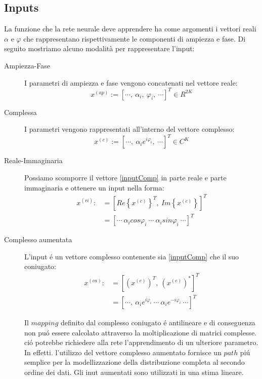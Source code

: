 \documentclass[a4paper,10pt]{article}
\begin{document}
\subsection{Inputs}
La funzione che la rete neurale deve apprendere ha come argomenti i vettori reali $\alpha$ e $\varphi$ che rappresentano rispettivamente le componenti di ampiezza e fase. Di seguito mostriamo alcuno modalità per rappresentare l'input:
\begin{description}
 \item[Ampiezza-Fase]
 I parametri di ampiezza e fase vengono concatenati nel vettore reale:
 \begin{equation}
  x^{\left( ap\right) } :=\left[ \cdots, \ \alpha_i, \ \varphi_i, \ \cdots\right]^T\in R^{2K}
 \end{equation}

 \item[Complessa] 
 I parametri vengono rappresentati all'interno del vettore complesso:
 \begin{equation}
  x^{\left( c\right) } :=\left[ \cdots, \ \alpha_i e^{i \varphi_i}, \ \cdots\right]^T\in C^{K}\label{inputComp}
 \end{equation}
 
 \item[Reale-Immaginaria]
 Possiamo scomporre il vettore \eqref{inputComp} in parte reale e parte immaginaria e ottenere un input nella forma:
 \begin{align}
  x^{\left( ri\right) } :&=\left[ Re\left \{ x^{\left(c\right) }\right \}^T, \ Im\left \{ x^{\left(c\right) } \right \} \right]^T\\
  &=\left[ \cdots \ \alpha_i cos\varphi_i \ \cdots \ \alpha_i sin\varphi_i \ \cdots\right]^T
 \end{align}

 \item[Complesso aumentata]
 L'input \'e un vettore complesso contenente sia \eqref{inputComp} che il suo coniugato:
 \begin{align}
  x^{\left( ca\right) } :&=\left[ \left( x^{\left(c\right) }\right)^T, \ \left( x^{\left(c\right) } \right)^* \right]^T\\
  &=\left[ \cdots, \ \alpha_i e^{i \varphi_i} \ \cdots \ \alpha_i e^{-i \varphi_i} \ \cdots\right]^T
 \end{align}

 Il $mapping$ definito dal complesso coniugato \'e antilineare e di conseguenza non pu\'o essere calcolato attraverso la moltiplicazione di matrici complesse. ci\'o potrebbe richiedere alla rete l'apprendimento di un ulteriore parametro. In effetti. l'utilizzo del vettore complesso aumentato fornisce un $path$ pi\'u semplice per la modellizzazione della distribuzione completa al secondo ordine dei dati. Gli inut aumentati sono utilizzati in una stima lineare.
\end{description}
\end{document}
